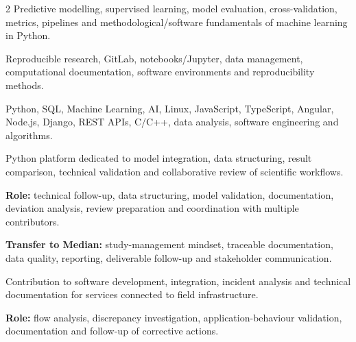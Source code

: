\documentclass[8pt,a4paper,ragged2e,withhyper]{altacv}
\begin{document}
\begin{paracol}{2}
\small{
Predictive modelling, supervised learning, model evaluation, cross-validation, metrics, pipelines and methodological/software fundamentals of machine learning in Python.
}

\divider


\small{
Reproducible research, GitLab, notebooks/Jupyter, data management, computational documentation, software environments and reproducibility methods.
}

\divider


\small{
Python, SQL, Machine Learning, AI, Linux, JavaScript, TypeScript, Angular, Node.js, Django, REST APIs, C/C++, data analysis, software engineering and algorithms.
}

\end{paracol}



Python platform dedicated to model integration, data structuring, result comparison, technical validation and collaborative review of scientific workflows.

\textbf{Role:} technical follow-up, data structuring, model validation, documentation, deviation analysis, review preparation and coordination with multiple contributors.

\textbf{Transfer to Median:} study-management mindset, traceable documentation, data quality, reporting, deliverable follow-up and stakeholder communication.

\divider


Contribution to software development, integration, incident analysis and technical documentation for services connected to field infrastructure.

\textbf{Role:} flow analysis, discrepancy investigation, application-behaviour validation, documentation and follow-up of corrective actions.
\end{document}
